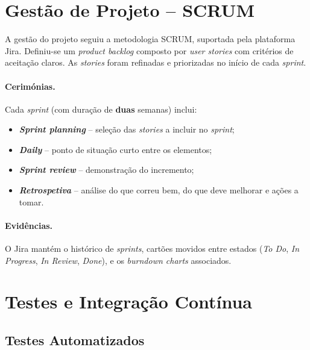 \documentclass[11pt,a4paper]{article}
\begin{document}
\section{Gestão de Projeto -- SCRUM}

A gestão do projeto seguiu a metodologia SCRUM, suportada pela plataforma
Jira. Definiu-se um \emph{product backlog} composto por \emph{user stories}
com critérios de aceitação claros. As \emph{stories} foram refinadas e
priorizadas no início de cada \emph{sprint}.

\paragraph{Cerimónias.}
Cada \emph{sprint} (com duração de \textbf{duas} semanas) inclui:
\begin{itemize}[leftmargin=*]
    \item \textbf{\emph{Sprint planning}} -- seleção das \emph{stories} a
          incluir no \emph{sprint};
    \item \textbf{\emph{Daily}} -- ponto de situação curto entre os elementos;
    \item \textbf{\emph{Sprint review}} -- demonstração do incremento;
    \item \textbf{\emph{Retrospetiva}} -- análise do que correu bem, do que
          deve melhorar e ações a tomar.
\end{itemize}

\paragraph{Evidências.} O Jira mantém o histórico de \emph{sprints}, cartões
movidos entre estados (\emph{To Do}, \emph{In Progress}, \emph{In Review},
\emph{Done}), e os \emph{burndown charts} associados.

\section{Testes e Integração Contínua}

\subsection{Testes Automatizados}
\end{document}
